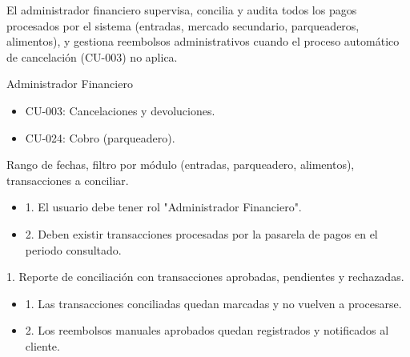 \begin{description}[leftmargin=!, labelwidth=3.4cm, style=nextline, topsep=3pt]
\item[Objetivo] El administrador financiero supervisa, concilia y audita todos los pagos procesados por el sistema (entradas, mercado secundario, parqueaderos, alimentos), y gestiona reembolsos administrativos cuando el proceso automático de cancelación (CU-003) no aplica.

\item[Actores] Administrador Financiero

\item[CU relacionados] \hfill
\begin{itemize}[leftmargin=1.2em, topsep=1pt]
  \item CU-003: Cancelaciones y devoluciones.
  \item CU-024: Cobro (parqueadero).
\end{itemize}

\item[Entradas] Rango de fechas, filtro por módulo (entradas, parqueadero, alimentos), transacciones a conciliar.

\item[Pre-condiciones] \hfill
\begin{itemize}[leftmargin=1.2em, topsep=1pt]
  \item 1. El usuario debe tener rol "Administrador Financiero".
  \item 2. Deben existir transacciones procesadas por la pasarela de pagos en el periodo consultado.
\end{itemize}

\item[Salidas] 1. Reporte de conciliación con transacciones aprobadas, pendientes y rechazadas.

\item[Post-condiciones] \hfill
\begin{itemize}[leftmargin=1.2em, topsep=1pt]
  \item 1. Las transacciones conciliadas quedan marcadas y no vuelven a procesarse.
  \item 2. Los reembolsos manuales aprobados quedan registrados y notificados al cliente.
\end{itemize}

\end{description}

